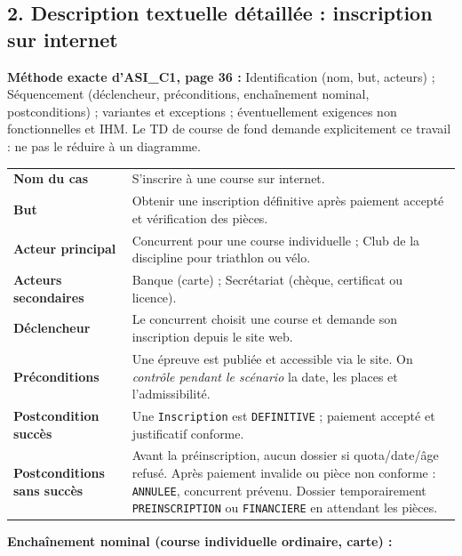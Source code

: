 \subsection{2. Description textuelle détaillée : inscription sur internet}
\begin{memo}
\textbf{Méthode exacte d'ASI\_C1, page 36 :} Identification (nom, but, acteurs) ; Séquencement (déclencheur, préconditions, enchaînement nominal, postconditions) ; variantes et exceptions ; éventuellement exigences non fonctionnelles et IHM. Le TD de course de fond demande explicitement ce travail : ne pas le réduire à un diagramme.
\end{memo}
\begin{tabularx}{\linewidth}{@{}p{40mm}X@{}}
\toprule
\textbf{Nom du cas} & S'inscrire à une course sur internet.\\
\textbf{But} & Obtenir une inscription définitive après paiement accepté et vérification des pièces.\\
\textbf{Acteur principal} & Concurrent pour une course individuelle ; Club de la discipline pour triathlon ou vélo.\\
\textbf{Acteurs secondaires} & Banque (carte) ; Secrétariat (chèque, certificat ou licence).\\
\textbf{Déclencheur} & Le concurrent choisit une course et demande son inscription depuis le site web.\\
\textbf{Préconditions} & Une épreuve est publiée et accessible via le site. On \emph{contrôle pendant le scénario} la date, les places et l'admissibilité.\\
\textbf{Postcondition succès} & Une \texttt{Inscription} est \texttt{DEFINITIVE} ; paiement accepté et justificatif conforme.\\
\textbf{Postconditions sans succès} & Avant la préinscription, aucun dossier si quota/date/âge refusé. Après paiement invalide ou pièce non conforme : \texttt{ANNULEE}, concurrent prévenu. Dossier temporairement \texttt{PREINSCRIPTION} ou \texttt{FINANCIERE} en attendant les pièces.\\
\bottomrule
\end{tabularx}
\textbf{Enchaînement nominal (course individuelle ordinaire, carte) :}

